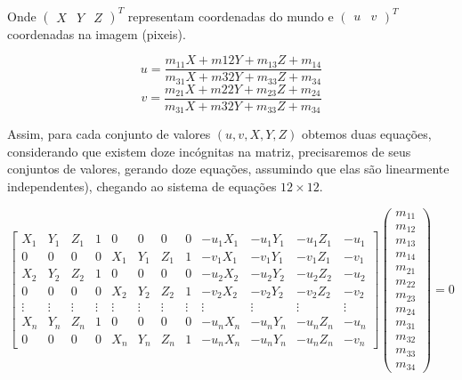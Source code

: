 \documentclass[ecp,tc]{iiufrgs}
\begin{document}
Onde $ \begin{pmatrix} X & Y & Z \end{pmatrix}^T $ representam coordenadas do mundo e $ \begin{pmatrix} u & v \end{pmatrix}^T $ coordenadas na imagem (pixeis).

\[
u = \dfrac{m_{11}X + m{12}Y + m_{13}Z + m_{14}}{m_{31}X + m{32}Y + m_{33}Z + m_{34}}
\]
\[
v = \dfrac{m_{21}X + m{22}Y + m_{23}Z + m_{24}}{m_{31}X + m{32}Y + m_{33}Z + m_{34}}
\]

Assim, para cada conjunto de valores $ (u, v, X, Y, Z) $ obtemos duas equações, considerando que existem doze incógnitas na matriz, precisaremos de seus conjuntos de valores, gerando doze equações, assumindo que elas são linearmente independentes),
chegando ao sistema de equações $ 12\times12 $.

\setcounter{MaxMatrixCols}{20}

\[
\begin{bmatrix}
X_1 & Y_1 & Z_1 & 1 & 0 & 0 & 0 & 0 & -u_1X_1 & -u_1Y_1 & -u_1Z_1 & -u_1 \\
0 & 0 & 0 & 0 & X_1 & Y_1 & Z_1 & 1 & -v_1X_1 & -v_1Y_1 & -v_1Z_1 & -v_1 \\
X_2 & Y_2 & Z_2 & 1 & 0 & 0 & 0 & 0 & -u_2X_2 & -u_2Y_2 & -u_2Z_2 & -u_2 \\
0 & 0 & 0 & 0 & X_2 & Y_2 & Z_2 & 1 & -v_2X_2 & -v_2Y_2 & -v_2Z_2 & -v_2 \\
\vdots & \vdots & \vdots & \vdots & \vdots & \vdots & \vdots & \vdots & \vdots & \vdots & \vdots & \vdots \\
X_n & Y_n & Z_n & 1 & 0 & 0 & 0 & 0 & -u_nX_n & -u_nY_n & -u_nZ_n & -u_n \\
0 & 0 & 0 & 0 & X_n & Y_n & Z_n & 1 & -u_nX_n & -u_nY_n & -u_nZ_n & -v_n 
\end{bmatrix}
\begin{pmatrix}m_{11} \\ m_{12} \\ m_{13} \\ m_{14} \\ m_{21} \\ m_{22} \\ m_{23} \\ m_{24} \\ m_{31} \\ m_{32} \\ m_{33} \\ m_{34} \end{pmatrix} = 0
\]
\end{document}
